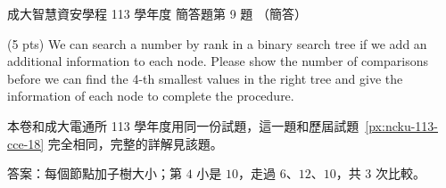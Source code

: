 \begin{pastexam}[label={px:ncku-113-isec-18}]{成大智慧資安學程 113 學年度 簡答題第 9 題}
（簡答）

(5 pts) We can search a number by rank in a binary search tree if we add an additional
information to each node. Please show the number of comparisons before we can find the 4-th
smallest values in the right tree and give the information of each node to complete the
procedure.

\begin{center}
\end{center}
\end{pastexam}

\begin{pastsoln}
本卷和成大電通所 113 學年度用同一份試題，這一題和歷屆試題~\ref{px:ncku-113-cce-18} 完全相同，完整的詳解見該題。

答案：每個節點加子樹大小；第 $4$ 小是 $10$，走過 $6$、$12$、$10$，共 $3$ 次比較。
\end{pastsoln}
